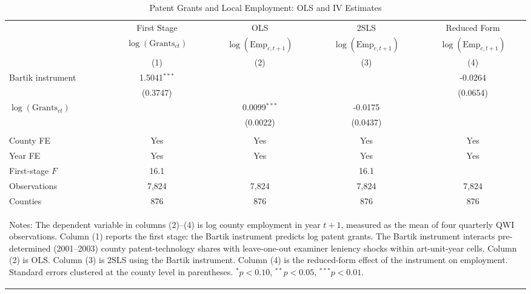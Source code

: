 \begin{table}[htbp]
\centering
\caption{Patent Grants and Local Employment: OLS and IV Estimates}
\label{tab:main}
\begin{tabular}{lcccc}
\hline\hline
 & First Stage & OLS & 2SLS & Reduced Form \\
 & $\log(\text{Grants}_{ct})$ & $\log(\text{Emp}_{c,t+1})$ & $\log(\text{Emp}_{c,t+1})$ & $\log(\text{Emp}_{c,t+1})$ \\
 & (1) & (2) & (3) & (4) \\
\hline
Bartik instrument & 1.5041$^{***}$ & & & -0.0264 \\
 & (0.3747) & & & (0.0654) \\
$\log(\text{Grants}_{ct})$ & & 0.0099$^{***}$ & -0.0175 & \\
 & & (0.0022) & (0.0437) & \\
\\[6pt]
County FE & Yes & Yes & Yes & Yes \\
Year FE & Yes & Yes & Yes & Yes \\
First-stage $F$ & 16.1 & & 16.1 & \\
Observations & 7,824 & 7,824 & 7,824 & 7,824 \\
Counties & 876 & 876 & 876 & 876 \\
\hline\hline
\multicolumn{5}{p{0.95\textwidth}}{\begin{flushleft}\small
Notes: The dependent variable in columns (2)--(4) is log county employment in year $t+1$, measured as the mean of four quarterly QWI observations. Column (1) reports the first stage: the Bartik instrument predicts log patent grants. The Bartik instrument interacts pre-determined (2001--2003) county patent-technology shares with leave-one-out examiner leniency shocks within art-unit-year cells. Column (2) is OLS. Column (3) is 2SLS using the Bartik instrument. Column (4) is the reduced-form effect of the instrument on employment. Standard errors clustered at the county level in parentheses. $^{*}p<0.10$, $^{**}p<0.05$, $^{***}p<0.01$.
\end{flushleft}}
\end{tabular}
\end{table}
